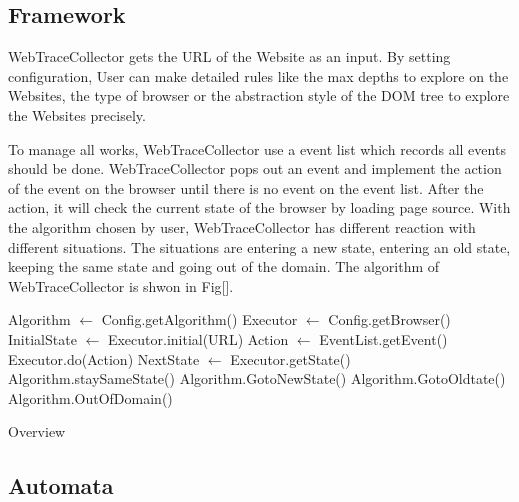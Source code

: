 
\subsection{Framework}

WebTraceCollector gets the URL of the Website as an input.
By setting configuration, User can make detailed rules like the max depths to explore on the Websites, the type of browser or the abstraction style of the DOM tree to explore the Websites precisely.

To manage all works, WebTraceCollector use a event list which records all events should be done.
WebTraceCollector pops out an event and implement the action of the event on the browser until there is no event on the event list.
After the action, it will check the current state of the browser by loading page source.
With the algorithm chosen by user, WebTraceCollector has different reaction with different situations.
The situations are entering a new state, entering an old state, keeping the same state and going out of the domain.
The algorithm of WebTraceCollector is shwon in Fig[].

\begin{algorithm}[htb]
	\begin{doublespace}		
		Algorithm $\gets$ Config.getAlgorithm()\;
		Executor $\gets$ Config.getBrowser()\;
		InitialState $\gets$ Executor.initial(URL)\;
		{
			Action $\gets$ EventList.getEvent()\;
			Executor.do(Action)\;
			NextState $\gets$ Executor.getState()\;
			{
				{ Algorithm.staySameState() }
				{ Algorithm.GotoNewState() }
				{ Algorithm.GotoOldtate() }
				{ Algorithm.OutOfDomain() }
			}			
		}		
	\end{doublespace}
	\caption{Overview}
	\label{algorithm:overview}
\end{algorithm} 


\subsection{Automata}

